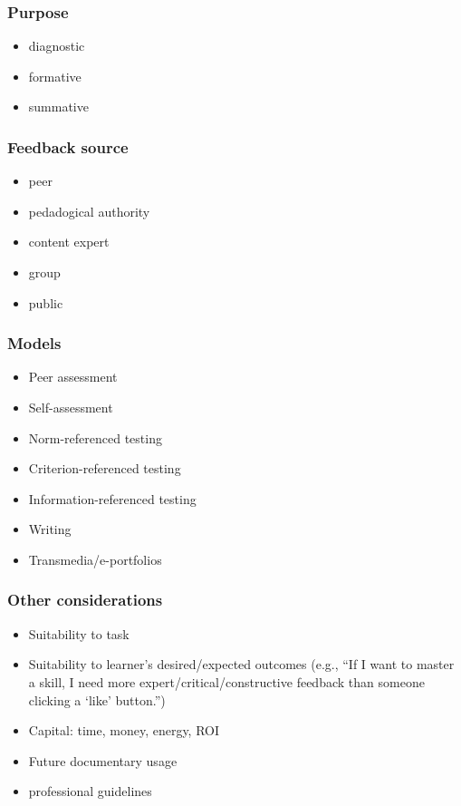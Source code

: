 \subsubsection{Purpose}

\begin{itemize}
\item
  diagnostic
\item
  formative
\item
  summative
\end{itemize}

\subsubsection{Feedback source}

\begin{itemize}
\item
  peer
\item
  pedadogical authority
\item
  content expert
\item
  group
\item
  public
\end{itemize}

\subsubsection{Models}

\begin{itemize}
\item
  Peer assessment
\item
  Self-assessment
\item
  Norm-referenced testing
\item
  Criterion-referenced testing
\item
  Information-referenced testing
\item
  Writing
\item
  Transmedia/e-portfolios
\end{itemize}

\subsubsection{Other considerations}

\begin{itemize}
\item
  Suitability to task
\item
  Suitability to learner's desired/expected outcomes (e.g., ``If I want
  to master a skill, I need more expert/critical/constructive feedback
  than someone clicking a `like' button.'')
\item
  Capital: time, money, energy, ROI
\item
  Future documentary usage
\item
  professional guidelines
\end{itemize}

